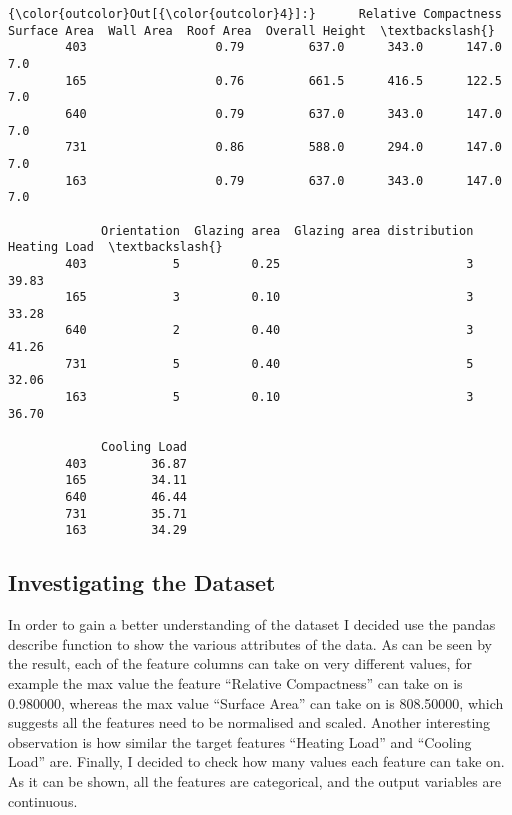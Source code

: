 \documentclass[11pt]{article}
\begin{document}
\begin{Verbatim}[commandchars=\\\{\}]
{\color{outcolor}Out[{\color{outcolor}4}]:}      Relative Compactness  Surface Area  Wall Area  Roof Area  Overall Height  \textbackslash{}
        403                  0.79         637.0      343.0      147.0             7.0   
        165                  0.76         661.5      416.5      122.5             7.0   
        640                  0.79         637.0      343.0      147.0             7.0   
        731                  0.86         588.0      294.0      147.0             7.0   
        163                  0.79         637.0      343.0      147.0             7.0   
        
             Orientation  Glazing area  Glazing area distribution  Heating Load  \textbackslash{}
        403            5          0.25                          3         39.83   
        165            3          0.10                          3         33.28   
        640            2          0.40                          3         41.26   
        731            5          0.40                          5         32.06   
        163            5          0.10                          3         36.70   
        
             Cooling Load  
        403         36.87  
        165         34.11  
        640         46.44  
        731         35.71  
        163         34.29  
\end{Verbatim}
            
    \hypertarget{investigating-the-dataset}{%
\subsection{Investigating the Dataset}\label{investigating-the-dataset}}

In order to gain a better understanding of the dataset I decided use the
pandas describe function to show the various attributes of the data. As
can be seen by the result, each of the feature columns can take on very
different values, for example the max value the feature ``Relative
Compactness'' can take on is 0.980000, whereas the max value ``Surface
Area'' can take on is 808.50000, which suggests all the features need to
be normalised and scaled. Another interesting observation is how similar
the target features ``Heating Load'' and ``Cooling Load'' are. Finally,
I decided to check how many values each feature can take on. As it can
be shown, all the features are categorical, and the output variables are
continuous.
\end{document}
